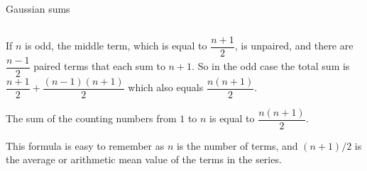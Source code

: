 \documentclass[9pt,aspectratio=169]{beamer}
\begin{document}
\begin{frame}{Gaussian sums}
\begin{columns}[T]
\begin{column}{0.5\textwidth}
      If $n$ is odd, the middle term, which is equal to $\dfrac{n + 1}{2}$, is unpaired, and there are $\dfrac{n − 1}{2}$ paired terms that each sum to $n + 1$.  So in the odd case the total sum is $\dfrac{n + 1}{2} + \dfrac{\left(n-1\right)\left(n+1\right)}{2}$ which also equals $\dfrac{n \left(n + 1\right)}{2}$. 
      \begin{definition}
        The sum of the counting numbers from $1$ to $n$ is equal to $\dfrac{n \left(n + 1\right)}{2}$. 
      \end{definition}
      This formula is easy to remember as $n$ is the number of terms, and $\left(n + 1\right) / 2$ is the average or arithmetic mean value of the terms in the series.
    \end{column}
  \end{columns}
\end{frame}
\end{document}
